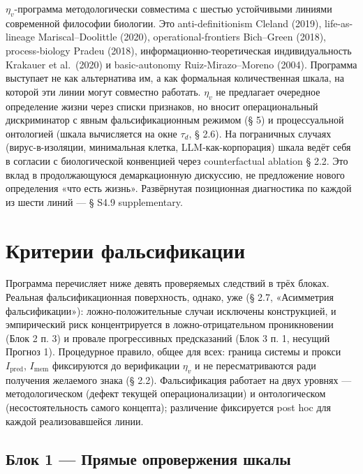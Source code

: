 \documentclass[pdflatex,sn-mathphys-ay]{sn-jnl}
\begin{document}
\(\eta_v\)-программа методологически совместима с шестью устойчивыми линиями современной философии биологии. Это anti-definitionism Cleland (2019), life-as-lineage Mariscal--Doolittle (2020), operational-frontiers Bich--Green (2018), process-biology Pradeu (2018), информационно-теоретическая индивидуальность Krakauer et al.~(2020) и basic-autonomy Ruiz-Mirazo--Moreno (2004). Программа выступает не как альтернатива им, а как формальная количественная шкала, на которой эти линии могут совместно работать. \(\eta_v\) не предлагает очередное определение жизни через списки признаков, но вносит операциональный дискриминатор с явным фальсификационным режимом (§ 5) и процессуальной онтологией (шкала вычисляется на окне \(\tau_d\), § 2.6). На пограничных случаях (вирус-в-изоляции, минимальная клетка, LLM-как-корпорация) шкала ведёт себя в согласии с биологической конвенцией через counterfactual ablation § 2.2. Это вклад в продолжающуюся демаркационную дискуссию, не предложение нового определения «что есть жизнь». Развёрнутая позиционная диагностика по каждой из шести линий --- § S4.9 supplementary.

\section{Критерии фальсификации}\label{ux43aux440ux438ux442ux435ux440ux438ux438-ux444ux430ux43bux44cux441ux438ux444ux438ux43aux430ux446ux438ux438}

Программа перечисляет ниже девять проверяемых следствий в трёх блоках. Реальная фальсификационная поверхность, однако, уже (§ 2.7, «Асимметрия фальсификации»): ложно-положительные случаи исключены конструкцией, и эмпирический риск концентрируется в ложно-отрицательном проникновении (Блок 2 п. 3) и провале прогрессивных предсказаний (Блок 3 п. 1, несущий Прогноз 1). Процедурное правило, общее для всех: граница системы и прокси \(I_{\text{pred}}\), \(I_{\text{mem}}\) фиксируются до верификации \(\eta_v\) и не пересматриваются ради получения желаемого знака (§ 2.2). Фальсификация работает на двух уровнях --- методологическом (дефект текущей операционализации) и онтологическом (несостоятельность самого концепта); различение фиксируется post hoc для каждой реализовавшейся линии.

\subsection{Блок 1 --- Прямые опровержения шкалы}\label{ux431ux43bux43eux43a-1-ux43fux440ux44fux43cux44bux435-ux43eux43fux440ux43eux432ux435ux440ux436ux435ux43dux438ux44f-ux448ux43aux430ux43bux44b}
\end{document}
